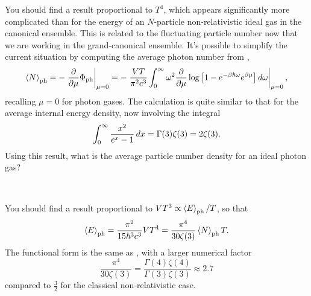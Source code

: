 You should find a result proportional to $T^4$, which appears significantly more complicated than  for the energy of an $N$-particle non-relativistic ideal gas in the canonical ensemble.
This is related to the fluctuating particle number now that we are working in the grand-canonical ensemble.
It's possible to simplify the current situation by computing the average photon number from ,
\begin{equation*}
  \left\langle N \right\rangle_{\text{ph}} = -\left. \frac{\partial }{\partial \mu} \Phi_{\text{ph}}\right|_{\mu = 0} = -\left. \frac{VT}{\pi^2 c^3} \int_0^{\infty} \omega^2 \frac{\partial }{\partial \mu} \log\left[1 - e^{-\beta \hbar \omega} e^{\beta \mu}\right] \mathop{d\omega} \right|_{\mu = 0},
\end{equation*}
recalling $\mu = 0$ for photon gases.
The calculation is quite similar to that for the average internal energy density, now involving the integral
\begin{equation*}
  \int_0^{\infty} \frac{x^2}{e^x - 1} \mathop{dx} = \Gamma(3) \zeta(3) = 2\zeta(3).
\end{equation*}
Using this result, what is the average particle number density for an ideal photon gas?
\begin{mdframed}
  \ \\[80 pt]
\end{mdframed}

You should find a result proportional to $VT^3 \propto \left\langle E \right\rangle_{\text{ph}} / T$, so that
\begin{equation}
  \label{eq:photon_gas_energy}
  \left\langle E \right\rangle_{\text{ph}} = \frac{\pi^2}{15 \hbar^3 c^3} VT^4 = \frac{\pi^4}{30\zeta(3)} \left\langle N \right\rangle_{\text{ph}} T.
\end{equation}
The functional form is the same as , with a larger numerical factor
\begin{equation*}
  \frac{\pi^4}{30\zeta(3)} = \frac{\Gamma(4) \zeta(4)}{\Gamma(3) \zeta(3)} \approx 2.7
\end{equation*}
compared to $\frac{3}{2}$ for the classical non-relativistic case.


